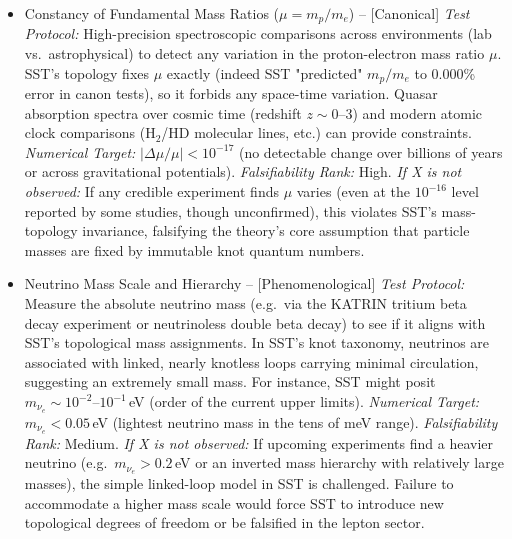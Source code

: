 \documentclass[11pt]{article}
\begin{document}
\begin{itemize}

\item
Constancy of Fundamental Mass Ratios ($\mu = m_p/m_e$) -- [Canonical] \textit{Test Protocol:} High-precision spectroscopic comparisons across environments (lab vs.\ astrophysical) to detect any variation in the proton-electron mass ratio $\mu$. SST's topology fixes $\mu$ exactly (indeed SST "predicted" $m_p/m_e$ to 0.000\% error in canon tests), so it forbids any space-time variation. Quasar absorption spectra over cosmic time (redshift $z\sim0$--3) and modern atomic clock comparisons (H$_2$/HD molecular lines, etc.) can provide constraints. \textit{Numerical Target:} $|\Delta\mu/\mu| < 10^{-17}$ (no detectable change over billions of years or across gravitational potentials). \textit{Falsifiability Rank:} High. \textit{If X is not observed:} If any credible experiment finds $\mu$ varies (even at the $10^{-16}$ level reported by some studies, though unconfirmed), this violates SST's mass-topology invariance, falsifying the theory's core assumption that particle masses are fixed by immutable knot quantum numbers.

\item
Neutrino Mass Scale and Hierarchy -- [Phenomenological] \textit{Test Protocol:} Measure the absolute neutrino mass (e.g.\ via the KATRIN tritium beta decay experiment or neutrinoless double beta decay) to see if it aligns with SST's topological mass assignments. In SST's knot taxonomy, neutrinos are associated with linked, nearly knotless loops carrying minimal circulation, suggesting an extremely small mass. For instance, SST might posit $m_{\nu_e}\sim10^{-2}$--$10^{-1}$\,eV (order of the current upper limits). \textit{Numerical Target:} $m_{\nu_e} < 0.05$\,eV (lightest neutrino mass in the tens of meV range). \textit{Falsifiability Rank:} Medium. \textit{If X is not observed:} If upcoming experiments find a heavier neutrino (e.g.\ $m_{\nu_e} > 0.2$\,eV or an inverted mass hierarchy with relatively large masses), the simple linked-loop model in SST is challenged. Failure to accommodate a higher mass scale would force SST to introduce new topological degrees of freedom or be falsified in the lepton sector.


\end{itemize}
\end{document}
